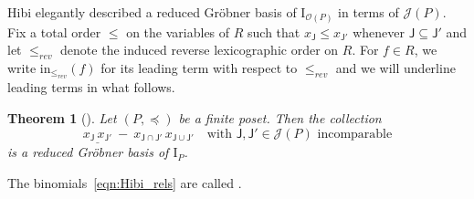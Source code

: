 \documentclass[11pt]{amsart}
\newtheorem{thm}{Theorem}[section]
\theoremstyle{definition}
\begin{document}
Hibi elegantly described a reduced Gr\"obner basis of ${\mathrm{I}}_{{\mathcal{O}({P})}}$ in terms of
${{\mathcal{J}}({P})}$.  Fix a total order $\le$ on the variables of $R$ such that
$x_{\mathsf{J}} \le x_{{\mathsf{J}}'}$ whenever ${\mathsf{J}} \subseteq {\mathsf{J}}'$ and let
${\le_{rev}}$ denote the induced reverse lexicographic order on $R$. For $f \in R$,
we write ${\textrm{in}_{\le_{rev}}}(f)$ for its leading term with respect to ${\le_{rev}}$ and we will
underline leading terms in what follows.

\begin{thm}[{\cite[Thm.~10.1.3]{HH11}}]\label{thm:HibiIdeal}
    Let $({P},\preceq)$ be a finite poset.
    Then the collection
    \begin{equation}\label{eqn:Hibi_rels}
        \underline{x_{\mathsf{J}} \, x_{{\mathsf{J}}'}} \ - \
        x_{{\mathsf{J}}\cap{\mathsf{J}}'} \, x_{{\mathsf{J}}\cup{\mathsf{J}}'} \quad \text{
        with }{\mathsf{J}},{\mathsf{J}}'\in{{\mathcal{J}}({P})}\text{ incomparable}
    \end{equation}
    is a reduced Gr\"obner basis of ${\mathrm{I}}_{P}$.
\end{thm}
The binomials~\eqref{eqn:Hibi_rels} are called {\textbf{\color{black}{Hibi relations}}}.
\end{document}
